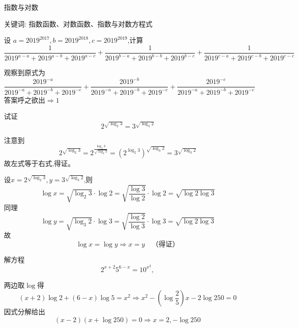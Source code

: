 \begin{center}
  {\fontsize{30pt}{26pt}\selectfont
    \hypertarget{指数与对数}{指数与对数} \label{指数与对数}
  }
\end{center}
\separator
\begin{center}
    关键词: 指数函数、对数函数、指数与对数方程式 
\end{center}
\vspace{0.5pt}

\begin{questions}
    \question 设 \( a=2019^{2017}, b=2019^{2018}, c=2019^{2019} \),计算
    \[
    \frac{1}{2019^{a - a} + 2019^{a - b} + 2019^{a - c}} + \frac{1}{2019^{b - a} + 2019^{b - b} + 2019^{b - c}} + \frac{1}{2019^{c - a} + 2019^{c - b} + 2019^{c - c}} 
    \]
    \begin{solution}
        观察到原式为
        \[
        \frac{2019^{-a}}{2019^{- a} + 2019^{- b} + 2019^{- c}} + \frac{2019^{-b}}{2019^{- a} + 2019^{- b} + 2019^{- c}} + \frac{2019^{-c}}{2019^{- a} + 2019^{- b} + 2019^{- c}} 
        \]
        答案呼之欲出$\Rightarrow1$
    \end{solution}          

    \question 试证
    \[
    2^{\sqrt{\log_2 3}} = 3^{\sqrt{\log_3 2}}
    \]
    \begin{solution}
        注意到
        \[
        2^{\sqrt{\log_2 3}} 
        = 2^{\frac{\log_2 3}{\sqrt{\log_2 3}}} 
        = \left(2^{\log_2 3}\right)^{\sqrt{\log_3 2}} 
        = 3^{\sqrt{\log_3 2}}
        \]
        故左式等于右式,得证。
    \end{solution}
    \begin{solution}
        设$x=2^{\sqrt{\log_2 3}},y=3^{\sqrt{\log_3 2}}$,则\[
        \log x=\sqrt{\log_2 3}\cdot \log 2 = \sqrt{\frac{\log 3}{\log 2}}\cdot\log 2 = \sqrt{\log 2 \log 3}
        \]同理\[
        \log y=\sqrt{\log_3 2} \cdot\log 3 = \sqrt{\frac{\log 2}{\log 3}}\cdot\log 3 = \sqrt{\log 2 \log 3}
        \]故\[\log x = \log y \Rightarrow x=y \quad\text{（得证）}\]
    \end{solution}

    \question 解方程
    \[
    2^{x+2}5^{6-x} = 10^{x^{2}},
    \]
    \begin{solution}
        两边取$\log$得
        \[
        (x+2)\log 2+(6-x)\log5=x^2 \Rightarrow x^2-\left(\log \frac{2}{5}\right)x-2\log 250=0
        \]
        因式分解给出
        \[
        (x-2)(x+\log 250)=0 \Rightarrow x = 2, -\log 250
        \]
    \end{solution}


\end{questions}

